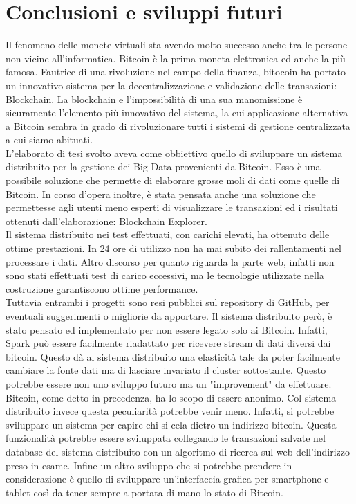 \chapter{Conclusioni e sviluppi futuri}
\label{chap:conclusioni e sviluppi futuri}
Il fenomeno delle monete virtuali sta avendo molto successo anche tra le persone non vicine all'informatica. Bitcoin è la prima moneta elettronica ed anche la più famosa. Fautrice di una rivoluzione nel campo della finanza, bitocoin ha  portato un innovativo sistema per la decentralizzazione e validazione delle transazioni: Blockchain. La blockchain e l'impossibilità di una sua manomissione è sicuramente l'elemento più innovativo del sistema, la cui applicazione alternativa a Bitcoin sembra in grado di rivoluzionare tutti i sistemi di gestione centralizzata a cui siamo abituati. 
\\ L'elaborato di tesi svolto aveva come obbiettivo quello di sviluppare un sistema distribuito per la gestione dei Big Data provenienti da Bitcoin. Esso è una possibile soluzione che permette di elaborare grosse moli di dati come quelle di Bitcoin. In corso d'opera inoltre, è stata pensata anche una soluzione che permettesse agli utenti meno esperti di visualizzare le transazioni ed i risultati ottenuti dall'elaborazione: Blockchain Explorer.
\\ Il sistema distribuito nei test effettuati, con carichi elevati, ha ottenuto delle ottime prestazioni. In 24 ore di utilizzo non ha mai subito dei rallentamenti nel processare i dati. Altro discorso per quanto riguarda la parte web, infatti non sono stati effettuati test di carico eccessivi, ma le tecnologie utilizzate nella costruzione garantiscono ottime performance.
\\ Tuttavia entrambi i progetti sono resi pubblici sul repository di GitHub, per eventuali suggerimenti o migliorie da apportare. Il sistema distribuito però, è stato pensato ed implementato per non essere legato solo ai Bitcoin. Infatti, Spark può essere facilmente riadattato per ricevere stream di dati diversi dai bitcoin. Questo dà al sistema distribuito una elasticità tale da poter facilmente cambiare la fonte dati ma di lasciare invariato il cluster sottostante. Questo potrebbe essere non uno sviluppo futuro ma un "improvement" da effettuare.
\\ Bitcoin, come detto in precedenza, ha lo scopo di essere anonimo. Col sistema distribuito invece questa peculiarità potrebbe venir meno. Infatti, si potrebbe sviluppare un sistema per capire chi si cela dietro un indirizzo bitcoin. Questa funzionalità potrebbe essere sviluppata collegando le transazioni salvate nel database del sistema distribuito con un algoritmo di ricerca sul web dell'indirizzo preso in esame. Infine un altro sviluppo che si potrebbe prendere in considerazione è quello di sviluppare un'interfaccia grafica per smartphone e tablet così da tener sempre a portata di mano lo stato di Bitcoin.
